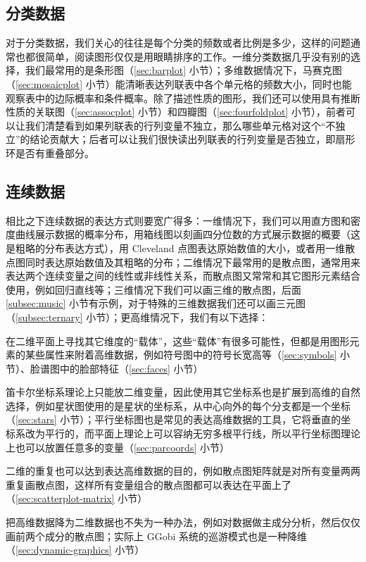 \documentclass[
  b5paper,
  UTF8,twoside]{book}
\providecommand{\tightlist}{%
  \setlength{\itemsep}{0pt}\setlength{\parskip}{0pt}}
\begin{document}
\subsection{分类数据}\label{ux5206ux7c7bux6570ux636e}

对于分类数据，我们关心的往往是每个分类的频数或者比例是多少，这样的问题通常也都很简单，阅读图形仅仅是用眼睛排序的工作。一维分类数据几乎没有别的选择，我们最常用的是条形图（\ref{sec:barplot} 小节）；多维数据情况下，马赛克图（\ref{sec:mosaicplot} 小节）能清晰表达列联表中各个单元格的频数大小，同时也能观察表中的边际概率和条件概率。除了描述性质的图形，我们还可以使用具有推断性质的关联图（\ref{sec:assocplot} 小节）和四瓣图（\ref{sec:fourfoldplot} 小节），前者可以让我们清楚看到如果列联表的行列变量不独立，那么哪些单元格对这个``不独立''的结论贡献大；后者可以让我们很快读出列联表的行列变量是否独立，即扇形环是否有重叠部分。

\subsection{连续数据}\label{ux8fdeux7eedux6570ux636e}

相比之下连续数据的表达方式则要宽广得多：一维情况下，我们可以用直方图和密度曲线展示数据的概率分布，用箱线图以刻画四分位数的方式展示数据的概要（这是粗略的分布表达方式），用 Cleveland 点图表达原始数值的大小，或者用一维散点图同时表达原始数值及其粗略的分布；二维情况下最常用的是散点图，通常用来表达两个连续变量之间的线性或非线性关系，而散点图又常常和其它图形元素结合使用，例如回归直线等；三维情况下我们可以画三维的散点图，后面 \ref{subsec:music} 小节有示例，对于特殊的三维数据我们还可以画三元图（\ref{subsec:ternary} 小节）；更高维情况下，我们有以下选择：

\begin{description}
\tightlist
\item[寻找载体]
在二维平面上寻找其它维度的``载体''，这些``载体''有很多可能性，但都是用图形元素的某些属性来附着高维数据，例如符号图中的符号长宽高等（\ref{sec:symbols} 小节）、脸谱图中的脸部特征（\ref{sec:faces} 小节）
\item[更改坐标系]
笛卡尔坐标系理论上只能放二维变量，因此使用其它坐标系也是扩展到高维的自然选择，例如星状图使用的是星状的坐标系，从中心向外的每个分支都是一个坐标（\ref{sec:stars} 小节）；平行坐标图也是常见的表达高维数据的工具，它将垂直的坐标系改为平行的，而平面上理论上可以容纳无穷多根平行线，所以平行坐标图理论上也可以放置任意多的变量（\ref{sec:parcoords} 小节）
\item[重复二维图形]
二维的重复也可以达到表达高维数据的目的，例如散点图矩阵就是对所有变量两两重复画散点图，这样所有变量组合的散点图都可以表达在平面上了（\ref{sec:scatterplot-matrix} 小节）
\item[降维]
把高维数据降为二维数据也不失为一种办法，例如对数据做主成分分析，然后仅仅画前两个成分的散点图；实际上 GGobi 系统的巡游模式也是一种降维（\ref{sec:dynamic-graphics} 小节）
\end{description}
\end{document}
